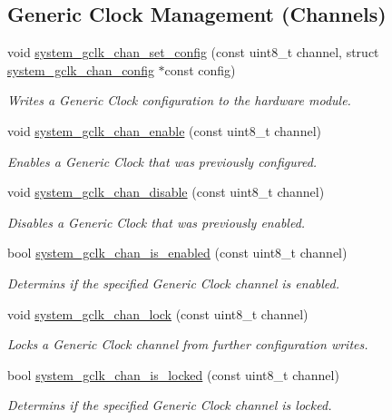 \subsection*{Generic Clock Management (Channels)}
\begin{DoxyCompactItemize}
\item 
void \hyperlink{group__asfdoc__sam0__system__clock__group_ga0dfbe40e700101f619ddc5b4eb83d78b}{system\+\_\+gclk\+\_\+chan\+\_\+set\+\_\+config} (const uint8\+\_\+t channel, struct \hyperlink{structsystem__gclk__chan__config}{system\+\_\+gclk\+\_\+chan\+\_\+config} $\ast$const config)
\begin{DoxyCompactList}\small\item\em Writes a Generic Clock configuration to the hardware module. \end{DoxyCompactList}\item 
void \hyperlink{group__asfdoc__sam0__system__clock__group_ga53e46ab144632c877a635ab70a7b51e1}{system\+\_\+gclk\+\_\+chan\+\_\+enable} (const uint8\+\_\+t channel)
\begin{DoxyCompactList}\small\item\em Enables a Generic Clock that was previously configured. \end{DoxyCompactList}\item 
void \hyperlink{group__asfdoc__sam0__system__clock__group_gaa1b945c9deba13fe8640563de4e11a53}{system\+\_\+gclk\+\_\+chan\+\_\+disable} (const uint8\+\_\+t channel)
\begin{DoxyCompactList}\small\item\em Disables a Generic Clock that was previously enabled. \end{DoxyCompactList}\item 
bool \hyperlink{group__asfdoc__sam0__system__clock__group_ga2467f733c23f6ad18e58a4f60deae0bb}{system\+\_\+gclk\+\_\+chan\+\_\+is\+\_\+enabled} (const uint8\+\_\+t channel)
\begin{DoxyCompactList}\small\item\em Determins if the specified Generic Clock channel is enabled. \end{DoxyCompactList}\item 
void \hyperlink{group__asfdoc__sam0__system__clock__group_ga59856030d55e3e50091116ffe930a356}{system\+\_\+gclk\+\_\+chan\+\_\+lock} (const uint8\+\_\+t channel)
\begin{DoxyCompactList}\small\item\em Locks a Generic Clock channel from further configuration writes. \end{DoxyCompactList}\item 
bool \hyperlink{group__asfdoc__sam0__system__clock__group_ga343a0b14dce2d7f2724382292ac1d8ef}{system\+\_\+gclk\+\_\+chan\+\_\+is\+\_\+locked} (const uint8\+\_\+t channel)
\begin{DoxyCompactList}\small\item\em Determins if the specified Generic Clock channel is locked. \end{DoxyCompactList}\end{DoxyCompactItemize}
